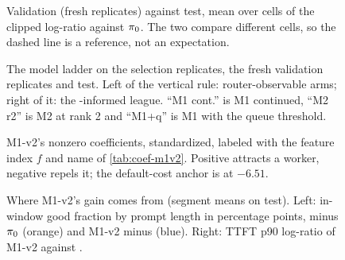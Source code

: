 \begin{figure}[tbp]
  \centering
  
  \caption{Validation (fresh replicates) against test, mean over cells of the clipped log-ratio
    against $\pi_{0}$. The two compare different cells, so the dashed line is a reference, not an
    expectation.}
  \label{fig:val-test}
\end{figure}

\begin{table}[tbp]
  \centering
  \caption{Rung-to-rung comparisons on test (descriptive).}
  \label{tab:ladder-pairs}
  
\end{table}

\begin{figure}[tbp]
  \centering
  
  \caption{The model ladder on the selection replicates, the fresh validation replicates and test.
    Left of the vertical rule: router-observable arms; right of it: the \ais{}-informed league. ``M1
    cont.'' is M1 continued, ``M2 r2'' is M2 at rank 2 and ``M1+q'' is M1 with the queue threshold.}
  \label{fig:ladder}
\end{figure}

\begin{figure}[tbp]
  \centering
  
  \caption{M1-v2's nonzero coefficients, standardized, labeled with the feature index $f$ and name
    of \cref{tab:coef-m1v2}. Positive attracts a worker, negative repels it; the default-cost
    anchor is at $-6.51$.}
  \label{fig:coef}
\end{figure}

\begin{figure}[tbp]
  \centering
  
  \caption{Where M1-v2's gain comes from (segment means on test). Left: in-window good fraction by
    prompt length in percentage points,  minus $\pi_{0}$ (orange) and M1-v2 minus
     (blue).
    Right: TTFT p90 log-ratio of M1-v2 against .}
  \label{fig:isl}
\end{figure}

